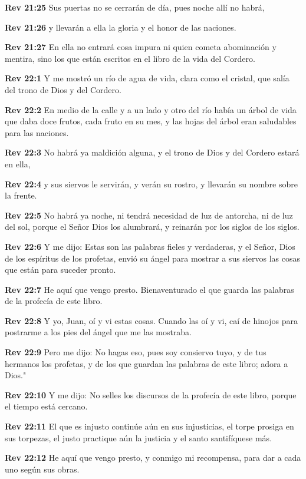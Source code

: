\textbf{Rev 21:25} Sus puertas no se cerrarán de día, pues noche allí no habrá, 

\textbf{Rev 21:26} y llevarán a ella la gloria y el honor de las naciones. 

\textbf{Rev 21:27} En ella no entrará cosa impura ni quien cometa abominación y mentira, sino los que están escritos en el libro de la vida del Cordero. 

\textbf{Rev 22:1} Y me mostró un río de agua de vida, clara como el cristal, que salía del trono de Dios y del Cordero. 

\textbf{Rev 22:2} En medio de la calle y a un lado y otro del río había un árbol de vida que daba doce frutos, cada fruto en su mes, y las hojas del árbol eran saludables para las naciones. 

\textbf{Rev 22:3} No habrá ya maldición alguna, y el trono de Dios y del Cordero estará en ella, 

\textbf{Rev 22:4} y sus siervos le servirán, y verán su rostro, y llevarán su nombre sobre la frente. 

\textbf{Rev 22:5} No habrá ya noche, ni tendrá necesidad de luz de antorcha, ni de luz del sol, porque el Señor Dios los alumbrará, y reinarán por los siglos de los siglos. 

\textbf{Rev 22:6} Y me dijo: Estas son las palabras fieles y verdaderas, y el Señor, Dios de los espíritus de los profetas, envió su ángel para mostrar a sus siervos las cosas que están para suceder pronto. 

\textbf{Rev 22:7} He aquí que vengo presto. Bienaventurado el que guarda las palabras de la profecía de este libro. 

\textbf{Rev 22:8} Y yo, Juan, oí y vi estas cosas. Cuando las oí y vi, caí de hinojos para postrarme a los pies del ángel que me las mostraba. 

\textbf{Rev 22:9} Pero me dijo: No hagas eso, pues soy consiervo tuyo, y de tus hermanos los profetas, y de los que guardan las palabras de este libro; adora a Dios." 

\textbf{Rev 22:10} Y me dijo: No selles los discursos de la profecía de este libro, porque el tiempo está cercano. 

\textbf{Rev 22:11} El que es injusto continúe aún en sus injusticias, el torpe prosiga en sus torpezas, el justo practique aún la justicia y el santo santifíquese más. 

\textbf{Rev 22:12} He aquí que vengo presto, y conmigo mi recompensa, para dar a cada uno según sus obras. 

